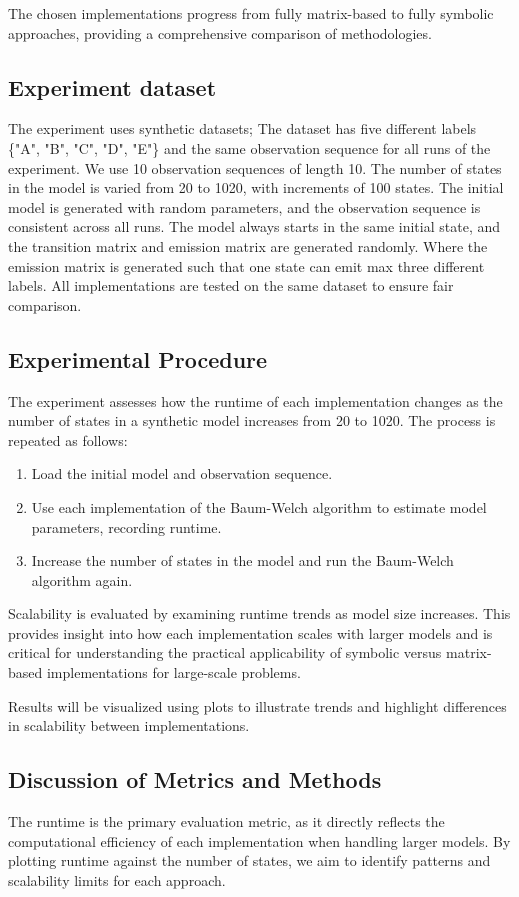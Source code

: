 The chosen implementations progress from fully matrix-based to fully symbolic approaches, providing a comprehensive comparison of methodologies.

\subsection{Experiment dataset}
The experiment uses synthetic datasets; The dataset has five different labels \{"A", "B", "C", "D", "E"\} and the same observation sequence for all runs of the experiment. 
We use 10 observation sequences of length 10.
The number of states in the model is varied from 20 to 1020, with increments of 100 states.
The initial model is generated with random parameters, and the observation sequence is consistent across all runs.
The model always starts in the same initial state, and the transition matrix and emission matrix are generated randomly.
Where the emission matrix is generated such that one state can emit max three different labels.
All implementations are tested on the same dataset to ensure fair comparison.

\subsection{Experimental Procedure}
The experiment assesses how the runtime of each implementation changes as the number of states in a synthetic model increases from 20 to 1020. 
The process is repeated as follows:

\begin{enumerate}
\item Load the initial model and observation sequence.
\item Use each implementation of the Baum-Welch algorithm to estimate model parameters, recording runtime.
\item Increase the number of states in the model and run the Baum-Welch algorithm again.
\end{enumerate}

Scalability is evaluated by examining runtime trends as model size increases.
This provides insight into how each implementation scales with larger models and is critical for understanding the practical applicability of symbolic versus matrix-based implementations for large-scale problems.

Results will be visualized using plots to illustrate trends and highlight differences in scalability between implementations.

\subsection{Discussion of Metrics and Methods}
The runtime is the primary evaluation metric, as it directly reflects the computational efficiency of each implementation when handling larger models. By plotting runtime against the number of states, we aim to identify patterns and scalability limits for each approach.

